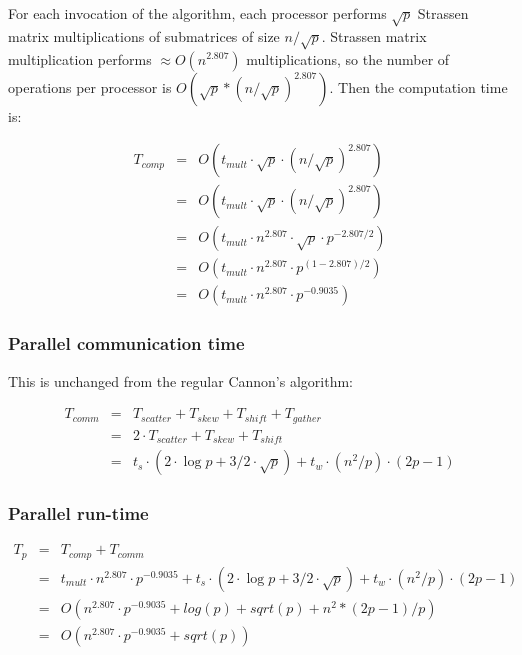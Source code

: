 \documentclass{article}
\begin{document}
For each invocation of the algorithm, each processor performs $\sqrt{p}$ Strassen
matrix multiplications of submatrices of size $n/\sqrt{p}$. Strassen matrix
multiplication performs $\approx O(n^{2.807})$ multiplications, so the number of
operations per processor is $O(\sqrt{p}*(n/\sqrt{p})^{2.807})$. Then the computation time is:

\begin{eqnarray*}
T_{{comp}} &=& O(t_{{mult}} \cdot \sqrt{p} \cdot (n/\sqrt{p})^{2.807}) \\
&=& O(t_{{mult}} \cdot \sqrt{p} \cdot (n/\sqrt{p})^{2.807}) \\
&=& O(t_{{mult}} \cdot n^{2.807} \cdot \sqrt{p} \cdot  p^{-2.807/2}) \\
&=& O(t_{{mult}} \cdot n^{2.807} \cdot  p^{(1-2.807)/2}) \\
&=& O(t_{{mult}} \cdot n^{2.807} \cdot  p^{-0.9035})
\end{eqnarray*}

\subsubsection{Parallel communication time}

This is unchanged from the regular Cannon's algorithm:

\begin{eqnarray*}
T_{{comm}} &=& T_{{scatter}} + T_{{skew}} + T_{{shift}} + T_{{gather}} \\
&=& 2 \cdot T_{{scatter}} + T_{{skew}} + T_{{shift}} \\
&=& t_s \cdot (2 \cdot \log{p} + 3/2 \cdot \sqrt{p}) + t_w \cdot (n^2/p) \cdot (2p-1)
\end{eqnarray*}


\subsubsection{Parallel run-time}

\begin{eqnarray*}
T_p &=& T_{{comp}} + T_{{comm}} \\
&=& t_{{mult}} \cdot n^{2.807} \cdot  p^{-0.9035} +  t_s \cdot (2 \cdot \log{p} + 3/2 \cdot \sqrt{p}) + t_w \cdot (n^2/p) \cdot (2p-1) \\
&=& O(n^{2.807} \cdot  p^{-0.9035} + log(p) + sqrt(p) + n^2*(2p-1)/p) \\
&=& O(n^{2.807} \cdot  p^{-0.9035} + sqrt(p))
\end{eqnarray*}
\end{document}
